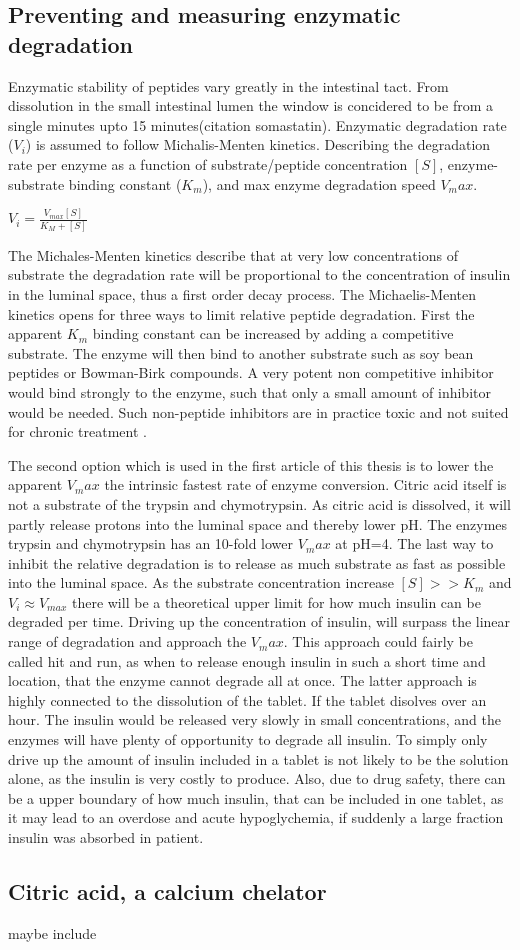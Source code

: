 \subsection{Preventing and measuring enzymatic degradation}
Enzymatic stability of peptides vary greatly in the intestinal tact. From dissolution in the small intestinal lumen the window is concidered to be from a single minutes upto 15 minutes(citation somastatin). Enzymatic degradation rate ($V_i$) is assumed to follow Michalis-Menten kinetics. Describing the degradation rate per enzyme as a function of substrate/peptide concentration $[S]$, enzyme-substrate binding constant ($K_m$), and max enzyme degradation speed $V_max$.

$V_i = \frac{V_{max} [S]}{K_{M}+[S]}$

The Michales-Menten kinetics describe that at very low concentrations of substrate the degradation rate will be proportional to the concentration of insulin in the luminal space, thus a first order decay process. 
The Michaelis-Menten kinetics opens for three ways to limit relative peptide degradation. First the apparent $K_m$ binding constant can be increased by adding a competitive substrate. The enzyme will then bind to another substrate such as soy bean peptides or Bowman-Birk compounds. A very potent non competitive inhibitor would bind strongly to the enzyme, such that only a small amount of inhibitor would be needed. Such non-peptide inhibitors are in practice toxic and not suited for chronic treatment \cite{bernkop1998use} \cite{murthy1980effect}. 

The second option which is used in the first article \cite{welling2014citric} of this thesis is to lower the apparent $V_max$ the intrinsic fastest rate of enzyme conversion. Citric acid itself is not a substrate of the trypsin and chymotrypsin. As citric acid is dissolved, it will partly release protons into the luminal space and thereby lower pH. The enzymes trypsin and chymotrypsin has an 10-fold lower $V_max$ at pH=4.
The last way to inhibit the relative degradation is to release as much substrate as fast as possible into the luminal space. As the substrate concentration increase $[S] >> K_m$ and $V_i \approx V_{max}$ there will be a theoretical upper limit for how much insulin can be degraded per time. Driving up the concentration of insulin, will surpass the linear range of degradation and approach the $V_max$. This approach could fairly be called hit and run, as when to release enough insulin in such a short time and location, that the enzyme cannot degrade all at once. The latter approach is highly connected to the dissolution of the tablet. If the tablet disolves over an hour. The insulin would be released very slowly in small concentrations, and the enzymes will have plenty of opportunity to degrade all insulin. To simply only drive up the amount of insulin included in a tablet is not likely to be the solution alone, as the insulin is very costly to produce. Also, due to drug safety, there can be a upper boundary of how much insulin, that can be included in one tablet, as it may lead to an overdose and acute hypoglychemia, if suddenly a large fraction insulin was absorbed in patient.


\subsection{Citric acid, a calcium chelator}
maybe include


\newpage

